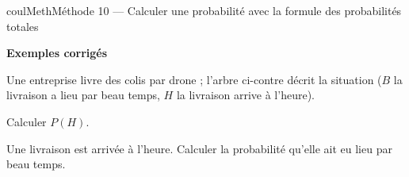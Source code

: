 \documentclass[11pt,a4paper]{article}
\makeatletter
\newcounter{lycee@signet}
\newcommand{\signet}[3][]{\stepcounter{lycee@signet}%
  \edef\lycee@dest{\if\relax\detokenize{#1}\relax
    signet.\arabic{lycee@signet}\else#1\fi}%
  \hypertarget{\lycee@dest}{}\bookmark[level=#2,dest=\lycee@dest]{#3}}
\newcounter{methode}
\newenvironment{methodebox}[1][Méthode]{\stepcounter{methode}%
  \begin{boitecours}[phantom={\signet[methode-\arabic{methode}]{2}{#1}}]{coulMeth}{#1}}%
  {\end{boitecours}}
\newcommand{\etape}[1]{\par\smallskip\textbf{\color{coulMeth}#1}\par\nobreak\smallskip}
\newcommand{\etapeexemples}{\etape{Exemples corrigés}}
\makeatother
\begin{document}
\begin{methodebox}[Méthode 10 --- Calculer une probabilité avec la formule des probabilités totales]
\etapeexemples
\begin{minipage}[c]{0.5\linewidth}\raggedright
Une entreprise livre des colis par drone ; l'arbre ci-contre décrit la situation ($B$ \og la
livraison a lieu par beau temps\fg{}, $H$ \og la livraison arrive à l'heure\fg{}).
\begin{questions}[label=\alph*)]
  \item Calculer $P(H)$.
  \item Une livraison est arrivée à l'heure. Calculer la probabilité qu'elle ait eu lieu
        par beau temps.
\end{questions}
\end{minipage}\hfill
\begin{minipage}[c]{0.46\linewidth}\centering
{}
\end{minipage}


\end{methodebox}
\end{document}
